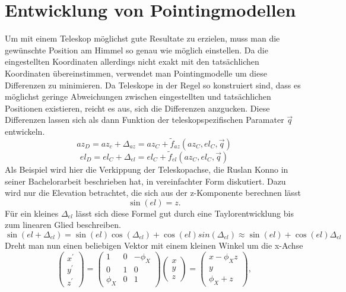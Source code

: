 \section{Entwicklung von Pointingmodellen}
Um mit einem Teleskop möglichst gute Resultate zu erzielen, muss man die gewünschte Position am Himmel so genau wie möglich einstellen. Da die eingestellten Koordinaten allerdings nicht exakt mit den tatsächlichen Koordinaten übereinstimmen, verwendet man Pointingmodelle um diese Differenzen zu minimieren. Da Teleskope in der Regel so konstruiert sind, dass es möglichst geringe Abweichungen zwischen eingestellten und tatsächlichen Positionen existieren, reicht es aus, sich die Differenzen anzgucken. Diese Differenzen lassen sich als dann Funktion der teleskopspezifischen Paramater $\vec{q}$ entwickeln.
\begin{equation}
az_D=az_c+\Delta_{az}=az_C+\tilde{f}_{az}\left(az_C,el_C,\vec{q}\right)
\end{equation}
\begin{equation}
el_D=el_C+\Delta_{el}=el_C+\tilde{f}_{el}\left(az_C,el_C,\vec{q}\right)
\label{eq:pointingZero}
\end{equation}
Als Beispiel wird hier die Verkippung der Teleskopachse, die Ruslan Konno in seiner Bachelorarbeit \cite{Ruslan} beschrieben hat, in vereinfachter Form diskutiert. Dazu wird nur die Elevation betrachtet, die sich aus der z-Komponente berechnen lässt
\begin{equation}
\sin(el)=z.
\end{equation}
Für ein kleines $\Delta_{el}$ lässt sich diese Formel gut durch eine Taylorentwicklung bis zum linearen Glied beschreiben.
\begin{equation}
\sin(el+\Delta_{el})=\sin(el)\cos(\Delta_{el})+\cos(el)sin(\Delta_{el})\approx \sin(el)+\cos(el)\Delta_{el}
\end{equation}
Dreht man nun einen beliebigen Vektor mit einem kleinen Winkel um die x-Achse
\begin{equation}
\left(\begin{array}{c}
x^{\prime}\\y^{\prime}\\z^{\prime}
\end{array}\right)=\left(\begin{array}{ccc}
1 & 0 & -\phi_X\\0 & 1 & 0 \\\phi_X & 0 & 1
\end{array}\right)\left(\begin{array}{c}
x\\y\\z
\end{array}\right)=\left(\begin{array}{c}
x-\phi_Xz\\y\\\phi_X+z
\end{array}\right),
\end{equation}
